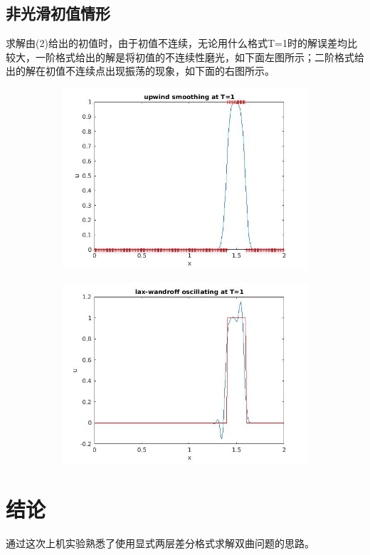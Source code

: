 \documentclass[12pt]{article}
\theoremstyle{remark}
\begin{document}
\subsection{非光滑初值情形}
求解由(2)给出的初值时，由于初值不连续，无论用什么格式T=1时的解误差均比较大，一阶格式给出的解是将初值的不连续性磨光，如下面左图所示；二阶格式给出的解在初值不连续点出现振荡的现象，如下面的右图所示。
\begin{figure}[!ht]
\centering
\begin{subfigure}{0.4\textwidth}
\includegraphics[width=\textwidth]{smoothing.jpg}
\end{subfigure}
\begin{subfigure}{0.4\textwidth}
\includegraphics[width=\textwidth]{oscillating.jpg}
\end{subfigure}
\end{figure}

\section{结论}
通过这次上机实验熟悉了使用显式两层差分格式求解双曲问题的思路。
\end{document}
